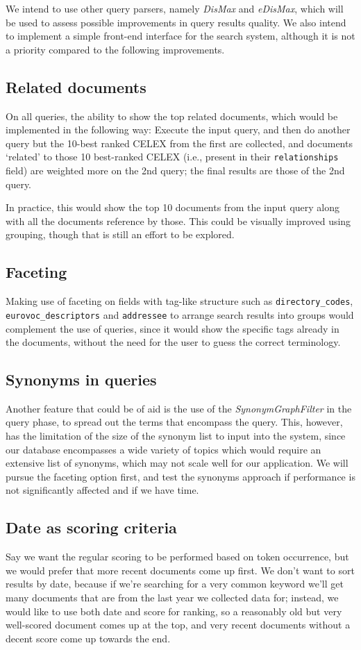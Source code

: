 \documentclass[sigconf, authorversion]{acmart}
\begin{document}
We intend to use other query parsers, namely \textit{DisMax} and \textit{eDisMax}, which will be used to assess possible improvements in query results quality.
We also intend to implement a simple front-end interface for the search system, although it is not a priority compared to the following improvements.

\subsection{Related documents}
On all queries, the ability to show the top related documents, which would be implemented in the following way: Execute the input query, and then do another query but the 10-best ranked CELEX from the first are collected, and documents `related' to those 10 best-ranked CELEX (i.e., present in their \texttt{relationships} field) are weighted more on the 2nd query; the final results are those of the 2nd query. 
    
In practice, this would show the top 10 documents from the input query along with all the documents reference by those. This could be visually improved using grouping, though that is still an effort to be explored.

\subsection{Faceting}
Making use of faceting on fields with tag-like structure such as \texttt{directory\_codes}, \texttt{eurovoc\_descriptors} and \texttt{addressee} to arrange search results into groups would complement the use of queries, since it would show the specific tags already in the documents, without the need for the user to guess the correct terminology.

\subsection{Synonyms in queries}
Another feature that could be of aid is the use of the \textit{SynonymGraphFilter} in the query phase, to spread out the terms that encompass the query. This, however, has the limitation of the size of the synonym list to input into the system, since our database encompasses a wide variety of topics which would require an extensive list of synonyms, which may not scale well for our application. We will pursue the faceting option first, and test the synonyms approach if performance is not significantly affected and if we have time.

\subsection{Date as scoring criteria}
Say we want the regular scoring to be performed based on token occurrence, but we would prefer that more recent documents come up first. We don't want to sort results by date, because if we're searching for a very common keyword we'll get many documents that are from the last year we collected data for; instead, we would like to use both date and score for ranking, so a reasonably old but very well-scored document comes up at the top, and very recent documents without a decent score come up towards the end.
\end{document}
